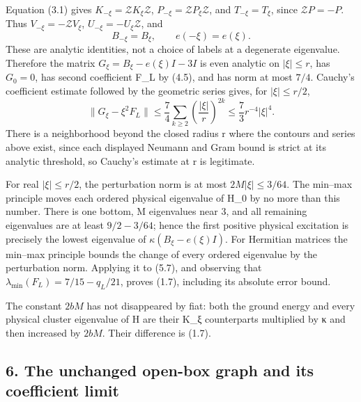 \documentclass[
  11pt,
]{article}
\begin{document}
Equation (3.1) gives \(K_{-\xi}=\mathcal ZK_\xi\mathcal Z\),
\(P_{-\xi}=\mathcal ZP_\xi\mathcal Z\), and \(T_{-\xi}=T_\xi\), since
\(\mathcal ZP=-P\). Thus \(V_{-\xi}=-\mathcal ZV_\xi\),
\(U_{-\xi}=-U_\xi\mathcal Z\), and \[
 B_{-\xi}=B_\xi,\qquad e(-\xi)=e(\xi).
\tag{5.6}
\] These are analytic identities, not a choice of labels at a degenerate
eigenvalue. Therefore the matrix \(G_\xi=B_\xi-e(\xi)I-3I\) is even
analytic on \(|\xi|\leq r\), has \(G_0=0\), has second coefficient F\_L
by (4.5), and has norm at most \(7/4\). Cauchy's coefficient estimate
followed by the geometric series gives, for \(|\xi|\leq r/2\), \[
 \|G_\xi-\xi^2F_L\|
 \leq\frac74\sum_{k\geq2}\left(\frac{|\xi|}{r}\right)^{2k}
 \leq\frac73r^{-4}|\xi|^4.
\tag{5.7}
\] There is a neighborhood beyond the closed radius r where the contours
and series above exist, since each displayed Neumann and Gram bound is
strict at its analytic threshold, so Cauchy's estimate at r is
legitimate.

For real \(|\xi|\leq r/2\), the perturbation norm is at most
\(2M|\xi|\leq3/64\). The min--max principle moves each ordered physical
eigenvalue of H\_0 by no more than this number. There is one bottom, M
eigenvalues near 3, and all remaining eigenvalues are at least
\(9/2-3/64\); hence the first positive physical excitation is precisely
the lowest eigenvalue of \(\kappa(B_\xi-e(\xi)I)\). For Hermitian
matrices the min--max principle bounds the change of every ordered
eigenvalue by the perturbation norm. Applying it to (5.7), and observing
that \(\lambda_{\min}(F_L)=7/15-q_L/21\), proves (1.7), including its
absolute error bound.

The constant \(2bM\) has not disappeared by fiat: both the ground energy
and every physical cluster eigenvalue of H are their K\_ξ counterparts
multiplied by κ and then increased by \(2bM\). Their difference is
(1.7).

\subsection{6. The unchanged open-box graph and its coefficient
limit}\label{magnetic-part-5-the-unchanged-open-box-graph-and-its-coefficient-limit}
\end{document}
